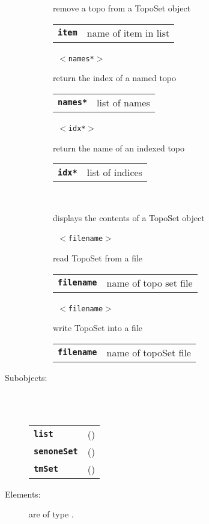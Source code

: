 \begin{description}
\begin{description}
        remove a topo from a TopoSet object

      \begin{tabular}{ll}
 \texttt{\textbf{item}} &  name of item in list  \\
      \end{tabular}
       \texttt{ $<$names*$>$} \

        return the index of a named topo

      \begin{tabular}{ll}
 \texttt{\textbf{names*}} & list of names \\
      \end{tabular}
       \texttt{ $<$idx*$>$} \

        return the name of an indexed topo

      \begin{tabular}{ll}
 \texttt{\textbf{idx*}} & list of indices \\
      \end{tabular}
       \texttt{} \

        displays the contents of a TopoSet object

       \texttt{ $<$filename$>$} \

        read TopoSet from a file

      \begin{tabular}{ll}
 \texttt{\textbf{filename}} &  name of topo set file  \\
      \end{tabular}
       \texttt{ $<$filename$>$} \

        write TopoSet into a file

      \begin{tabular}{ll}
 \texttt{\textbf{filename}} &  name of topoSet file  \\
      \end{tabular}
    \end{description}

  \item[Subobjects:] \hfill \\
\ 
    \begin{tabular}{ll}
      \texttt{\textbf{list}} & (\Jref{module}{List}) \\
      \texttt{\textbf{senoneSet}} & (\Jref{module}{SenoneSet}) \\
      \texttt{\textbf{tmSet}} & (\Jref{module}{TmSet}) \\
    \end{tabular}
\vspace{3mm}

  \item[Elements:] are of type .


\end{description}

